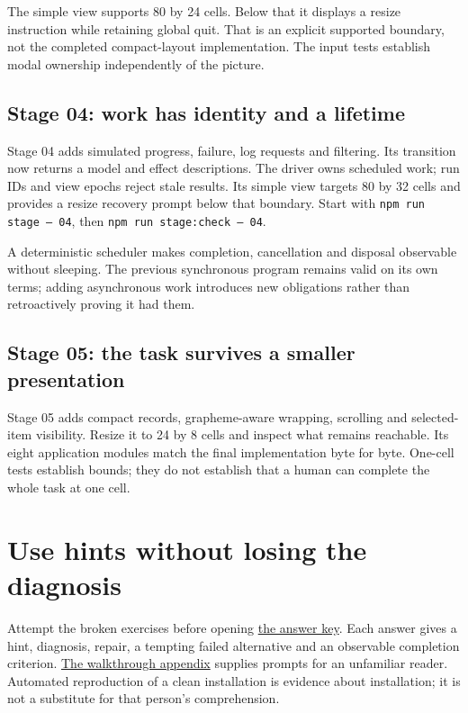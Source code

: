 The simple view supports 80 by 24 cells. Below that it displays a resize instruction while retaining global quit. That is an explicit supported boundary, not the completed compact-layout implementation. The input tests establish modal ownership independently of the picture.

\subsection{Stage 04: work has identity and a lifetime}

Stage 04 adds simulated progress, failure, log requests and filtering. Its transition now returns a model and effect descriptions. The driver owns scheduled work; run IDs and view epochs reject stale results. Its simple view targets 80 by 32 cells and provides a resize recovery prompt below that boundary. Start with \texttt{npm run stage -- 04}, then \texttt{npm run stage:check -- 04}.

A deterministic scheduler makes completion, cancellation and disposal observable without sleeping. The previous synchronous program remains valid on its own terms; adding asynchronous work introduces new obligations rather than retroactively proving it had them.

\subsection{Stage 05: the task survives a smaller presentation}

Stage 05 adds compact records, grapheme-aware wrapping, scrolling and selected-item visibility. Resize it to 24 by 8 cells and inspect what remains reachable. Its eight application modules match the final  implementation byte for byte. One-cell tests establish bounds; they do not establish that a human can complete the whole task at one cell.

\section{Use hints without losing the diagnosis}

Attempt the broken exercises before opening \hyperref[exercise-answers]{the answer key}. Each answer gives a hint, diagnosis, repair, a tempting failed alternative and an observable completion criterion. \hyperref[reader-walkthrough]{The walkthrough appendix} supplies prompts for an unfamiliar reader. Automated reproduction of a clean installation is evidence about installation; it is not a substitute for that person's comprehension.
